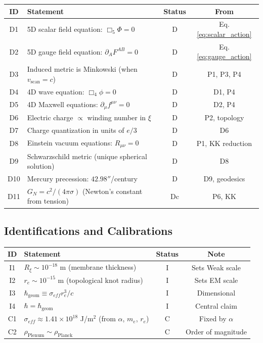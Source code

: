 \begin{center}
\begin{tabular}{|c|p{8cm}|c|c|}
\hline
\textbf{ID} & \textbf{Statement} & \textbf{Status} & \textbf{From} \\
\hline
D1 & 5D scalar field equation: $\Box_5\Phi = 0$ & D & Eq.\eqref{eq:scalar_action} \\
\hline
D2 & 5D gauge field equation: $\partial_A F^{AB} = 0$ & D & Eq.\eqref{eq:gauge_action} \\
\hline
D3 & Induced metric is Minkowski (when $v_{\text{scan}} = c$) & D & P1, P3, P4 \\
\hline
D4 & 4D wave equation: $\Box_4\phi = 0$ & D & D1, P4 \\
\hline
D5 & 4D Maxwell equations: $\partial_\mu f^{\mu\nu} = 0$ & D & D2, P4 \\
\hline
D6 & Electric charge $\propto$ winding number in $\xi$ & D & P2, topology \\
\hline
D7 & Charge quantization in units of $e/3$ & D & D6 \\
\hline
D8 & Einstein vacuum equations: $R_{\mu\nu} = 0$ & D & P1, KK reduction \\
\hline
D9 & Schwarzschild metric (unique spherical solution) & D & D8 \\
\hline
D10 & Mercury precession: $42.98''$/century & D & D9, geodesics \\
\hline
D11 & $G_N = c^2/(4\pi\sigma)$ (Newton's constant from tension) & Dc & P6, KK \\
\hline
\end{tabular}
\end{center}

\subsection{Identifications and Calibrations}

\begin{center}
\begin{tabular}{|c|p{8cm}|c|c|}
\hline
\textbf{ID} & \textbf{Statement} & \textbf{Status} & \textbf{Note} \\
\hline
I1 & $R_\xi \sim 10^{-18}$ m (membrane thickness) & I & Sets Weak scale \\
\hline
I2 & $r_e \sim 10^{-15}$ m (topological knot radius) & I & Sets EM scale \\
\hline
I3 & $\hbar_{\text{geom}} \equiv \sigma_{eff} r_e^3 / c$ & I & Dimensional \\
\hline
I4 & $\hbar = \hbar_{\text{geom}}$ & I & Central claim \\
\hline
C1 & $\sigma_{eff} \approx 1.41 \times 10^{18}$ J/m$^2$ (from $\alpha$, $m_e$, $r_e$) & C & Fixed by $\alpha$ \\
\hline
C2 & $\rho_{\text{Plenum}} \sim \rho_{\text{Planck}}$ & C & Order of magnitude \\
\hline
\end{tabular}
\end{center}

